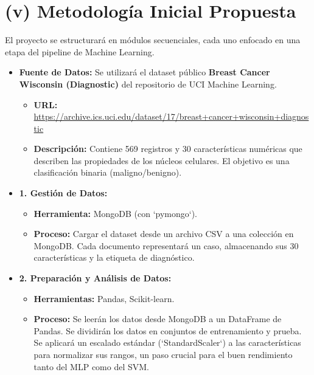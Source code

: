 \documentclass[12pt]{src/formato_utem}
\begin{document}
\section*{(v) Metodología Inicial Propuesta}
El proyecto se estructurará en módulos secuenciales, cada uno enfocado en una etapa del pipeline de Machine Learning.

\begin{itemize}
    \item \textbf{Fuente de Datos:} Se utilizará el dataset público \textbf{Breast Cancer Wisconsin (Diagnostic)} del repositorio de UCI Machine Learning.
    \begin{itemize}
        \item \textbf{URL:} \url{https://archive.ics.uci.edu/dataset/17/breast+cancer+wisconsin+diagnostic}
        \item \textbf{Descripción:} Contiene 569 registros y 30 características numéricas que describen las propiedades de los núcleos celulares. El objetivo es una clasificación binaria (maligno/benigno).
    \end{itemize}
    
    \item \textbf{1. Gestión de Datos:}
    \begin{itemize}
        \item \textbf{Herramienta:} MongoDB (con `pymongo`).
        \item \textbf{Proceso:} Cargar el dataset desde un archivo CSV a una colección en MongoDB. Cada documento representará un caso, almacenando sus 30 características y la etiqueta de diagnóstico.
    \end{itemize}

    \item \textbf{2. Preparación y Análisis de Datos:}
    \begin{itemize}
        \item \textbf{Herramientas:} Pandas, Scikit-learn.
        \item \textbf{Proceso:} Se leerán los datos desde MongoDB a un DataFrame de Pandas. Se dividirán los datos en conjuntos de entrenamiento y prueba. Se aplicará un escalado estándar (`StandardScaler`) a las características para normalizar sus rangos, un paso crucial para el buen rendimiento tanto del MLP como del SVM.
    \end{itemize}


\end{itemize}
\end{document}
